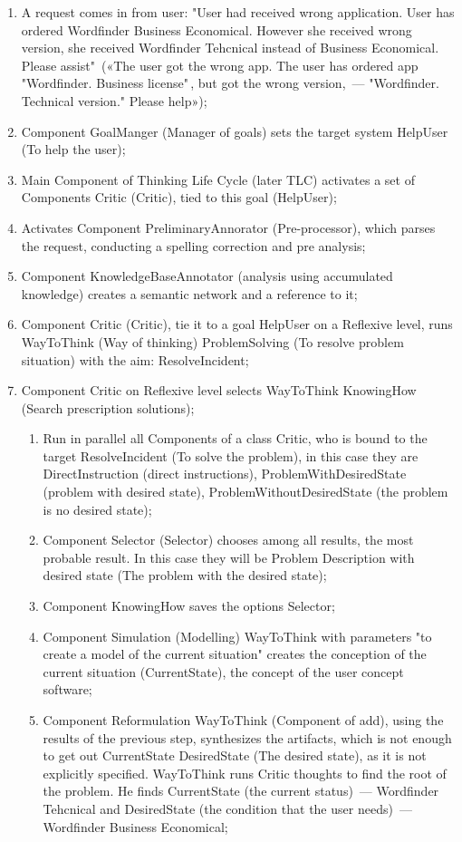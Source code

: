 \begin{enumerate}
	\item A request comes in from user: 
	"User had received wrong application. User has ordered Wordfinder Business Economical. However she received wrong version, she received Wordfinder Tehcnical instead of Business Economical. Please assist"\ («The user got the wrong app. The user has ordered app "Wordfinder. Business license"\,, but got the wrong version,~--- "Wordfinder. Technical version." Please help»);
	\item Component GoalManger (Manager of goals) sets the target system HelpUser (To help the user);
	\item Main Component of Thinking Life Cycle (later TLC) activates a set of Components Critic (Critic), tied to this goal (HelpUser); 
	\item Activates Component PreliminaryAnnorator (Pre-processor), which parses the request, conducting a spelling correction and pre analysis;
	\item Component KnowledgeBaseAnnotator (analysis using accumulated knowledge) creates a semantic network and a reference to it;
	\item Component Critic (Critic), tie it to a goal HelpUser on a Reflexive level, runs WayToThink (Way of thinking) ProblemSolving (To resolve problem situation) with the aim: ResolveIncident;
	\item Component Critic on Reflexive level selects WayToThink KnowingHow (Search prescription solutions);
	\begin{enumerate}
	\item Run in parallel all Components of a class Critic, who is bound to the target ResolveIncident (To solve the problem), in this case they are DirectInstruction (direct instructions), ProblemWithDesiredState (problem with desired state), ProblemWithoutDesiredState (the problem is no desired state);
	\item Component Selector (Selector) chooses among all results, the most probable result. In this case they will be Problem Description with desired state (The problem with the desired state);
	\item Component KnowingHow saves the options Selector;
	\item Component Simulation (Modelling) WayToThink with parameters "to create a model of the current situation" creates the conception of the current situation (CurrentState), the concept of the user concept software;
	\item Component Reformulation WayToThink (Component of add), using the results of the previous step, synthesizes the artifacts, which is not enough to get out CurrentState DesiredState (The desired state), as it is not explicitly specified. WayToThink runs Critic thoughts to find the root of the problem. He finds CurrentState (the current status)~--- Wordfinder Tehcnical and DesiredState (the condition that the user needs)~--- Wordfinder Business Economical;

\end{enumerate}
\end{enumerate}
